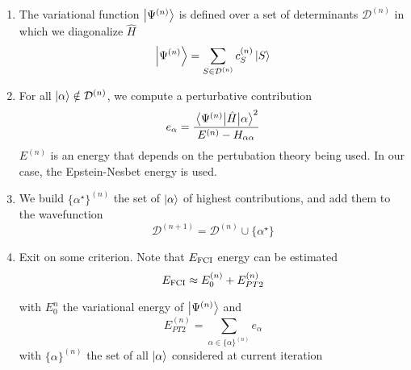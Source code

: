 \documentclass[./thesis.tex]{subfiles}
\begin{document}
\begin{enumerate}
\item

The variational function $\ket {\Psi^{(n)}}$ is defined over a set of determinants $  \mathcal{D}^{(n)}$ in which we diagonalize $\widehat{H}$
\begin{equation}
\ket{\Psi^{(n)}} = \sum_{S \in \mathcal{D}^{(n)}} c_S^{(n)} \ket{S}
\end{equation}

\item
For all ${\ket{\alpha}} \notin \mathcal{D}^{(n)}$, we compute a perturbative contribution
\begin{equation}
e_\alpha = \frac{\mel{\Psi^{(n)}}{\hat{H}}{\alpha}^2}{E^{(n)} - H_{\alpha \alpha}}
\end{equation}
$E^{(n)}$ is an energy that depends on the pertubation theory being used. In our case, the Epstein-Nesbet energy is used.

\item
We build $\{ \alpha^\star \}^{(n)}$ the set of ${\ket{\alpha}}$ of highest contributions, and add them to the wavefunction
\begin{equation}
\mathcal{D}^{(n+1)} = \mathcal{D}^{(n)} \cup \{ \alpha^\star \}
\end{equation}

\item
Exit on some criterion. Note that $E_\text{FCI}$ energy can be estimated
\begin{equation}
E_\text{FCI} \approx E^{(n)}_0 + E_{PT2}^{(n)}
\end{equation}


with $E^n_0$ the variational energy of $\ket {\Psi^{(n)}}$ and
\begin{equation}
E_{PT2}^{(n)} = \sum_{\alpha \in \{\alpha \}^{(n)}} e_\alpha
\end{equation}
with $\{ \alpha \}^{(n)}$ the set of all ${\ket{\alpha}}$ considered at current iteration

\end{enumerate}
\end{document}
